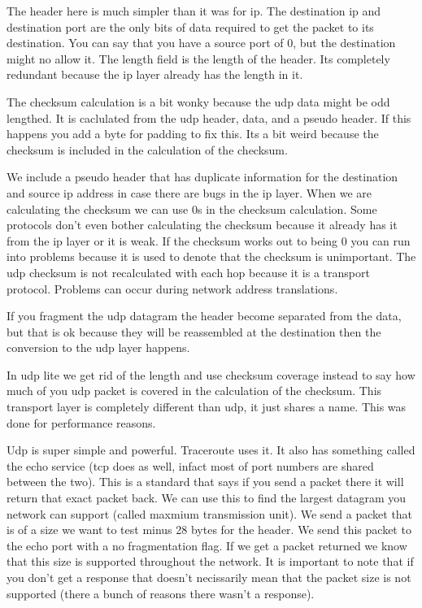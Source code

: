 \documentclass[12pt]{article}
\begin{document}

The header here is much simpler than it was for ip. The destination ip and destination port are the only bits of data required to get the packet to its destination. You can say that you have a source port of 0, but the destination might no allow it. The length field is the length of the header. Its completely redundant because the ip layer already has the length in it. 


The checksum calculation is a bit wonky because the udp data might be odd lengthed. It is caclulated from the udp header, data, and a pseudo header. If this happens you add a byte for padding to fix this. Its a bit weird because the checksum is included in the calculation of the checksum.


We include a pseudo header that has duplicate information for the destination and source ip address in case there are bugs in the ip layer. When we are calculating the checksum we can use 0s in the checksum calculation. Some protocols don't even bother calculating the checksum because it already has it from the ip layer or it is weak. If the checksum works out to being 0 you can run into problems because it is used to denote that the checksum is unimportant. The udp checksum is not recalculated with each hop because it is a transport protocol. Problems can occur during network address translations.

If you fragment the udp datagram the header become separated from the data, but that is ok because they will be reassembled at the destination then the conversion to the udp layer happens. 


In udp lite we get rid of the length and use checksum coverage instead to say how much of you udp packet is covered in the calculation of the checksum.  This transport layer is completely different than udp, it just shares a name. This was done for performance reasons. 


Udp is super simple and powerful. Traceroute uses it. It also has something called the echo service (tcp does as well, infact most of port numbers are shared between the two). This is a standard that says if you send a packet there it will return that exact packet back. We can use this to find the largest datagram you network can support (called maxmium transmission unit). We send a packet that is of a size we want to test minus 28 bytes for the header. We send this packet to the echo port with a no fragmentation flag. If we get a packet returned we know that this size is supported throughout the network. It is important to note that if you don't get a response that doesn't necissarily mean that the packet size is not supported (there a bunch of reasons there wasn't a response).  
\end{document}
